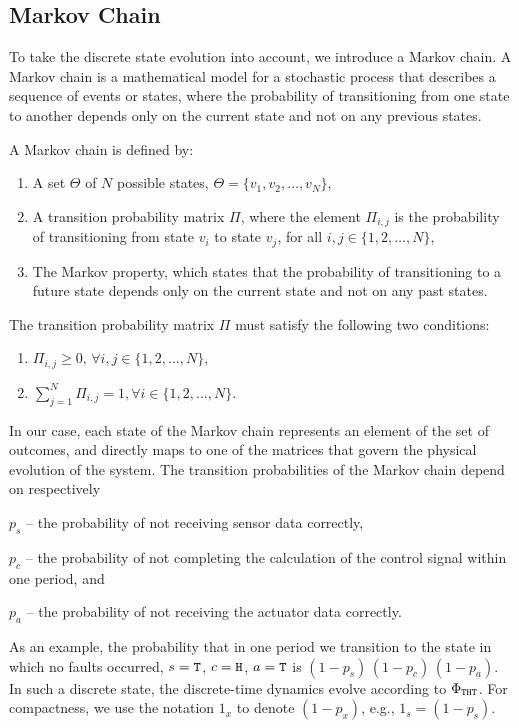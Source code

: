 \subsection{Markov Chain}%
\label{sec:mc}%

To take the discrete state evolution into account, we introduce a Markov chain.
A Markov chain is a mathematical model for a stochastic process that describes a sequence of events or states, where the probability of transitioning from one state to another depends only on the current state and not on any previous states.

\begin{definition}
    A Markov chain is defined by:
    \begin{enumerate}[label=(\roman*)]
        \item A set $\Theta$ of $N$ possible states, $\Theta = \{ v_1, v_2, \dots, v_N \}$,
        \item A transition probability matrix $\Pi$, where the element $\Pi_{i, j}$ is the probability of transitioning from state $v_i$ to state $v_j$, for all $i,j \in \{ 1,2, \dots ,N \}$,
        \item The Markov property, which states that the probability of transitioning to a future state depends only on the current state and not on any past states.
    \end{enumerate}
    The transition probability matrix $\Pi$ must satisfy the following two conditions:
    \begin{enumerate}[label=(\roman*)]
        \itemsep1pt
        \item $\Pi_{i, j} \geq 0, \, \forall i,j \in \{1,2,...,N\}$,
        \item $\sum^{N}_{j=1} \Pi_{i, j} = 1, \forall i \in \{1,2,...,N\}$.
    \end{enumerate}
\end{definition}

In our case, each state of the Markov chain represents an element of the set of outcomes, and directly maps to one of the matrices that govern the physical evolution of the system.
The transition probabilities of the Markov chain depend on respectively
\begin{enumerate*}[label=(\roman*)]
    \item $p_s$ -- the probability of not receiving sensor data correctly,
    \item $p_c$ -- the probability of not completing the calculation of the control signal within one period, and
    \item $p_a$ -- the probability of not receiving the actuator data correctly.
\end{enumerate*}
As an example, the probability that in one period we transition to the state in which no faults occurred, $s=\texttt{T}$, $c=\texttt{H}$, $a=\texttt{T}$ is $(1-p_s)\,(1-p_c)\,(1-p_a)$.
In such a discrete state, the discrete-time dynamics evolve according to $\Phi_{\texttt{T}\texttt{H}\texttt{T}}$.
For compactness, we use the notation $1_x$ to denote $(1-p_x)$, e.g., $1_s = (1-p_s)$.

